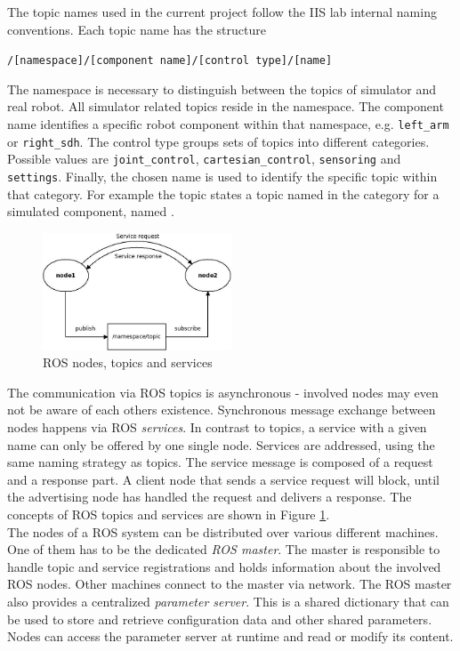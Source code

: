 The topic names used in the current project follow the IIS lab internal naming conventions. Each topic name has the structure
\begin{center}
\texttt{/[namespace]/[component name]/[control type]/[name]}
\end{center}
The namespace is necessary to distinguish between the topics of simulator and real robot. All simulator related topics reside in the  namespace. The component name identifies a specific robot component within that namespace, e.g. \texttt{left\_arm} or \texttt{right\_sdh}. The control type groups sets of topics into different categories. Possible values are \texttt{joint\_control}, \texttt{cartesian\_control}, \texttt{sensoring} and \texttt{settings}. Finally, the chosen name is used to identify the specific topic within that category. For example the topic  states a topic named  in the category  for a simulated component, named . \\

\begin{figure}[h]
	\centering
  \includegraphics[width=0.5\textwidth]{images/ros_concept.jpg}
	\caption{ROS nodes, topics and services}
	\label{fig:ros_concept}
\end{figure}

The communication via ROS topics is asynchronous - involved nodes may even not be aware of each others existence. Synchronous message exchange between nodes happens via ROS \emph{services}. In contrast to topics, a service with a given name can only be offered by one single node. Services are addressed, using the same naming strategy as topics. The service message is composed of a request and a response part. A client node that sends a service request will block, until the advertising node has handled the request and delivers a response. The concepts of ROS topics and services are shown in Figure \ref{fig:ros_concept}.\\

The nodes of a ROS system can be distributed over various different machines. One of them has to be the dedicated \emph{ROS master}. The master is responsible to handle topic and service registrations and holds information about the involved ROS nodes. Other machines connect to the master via network. The ROS master also provides a centralized \emph{parameter server}. This is a shared dictionary that can be used to store and retrieve configuration data and other shared parameters. Nodes can access the parameter server at runtime and read or modify its content. \\

